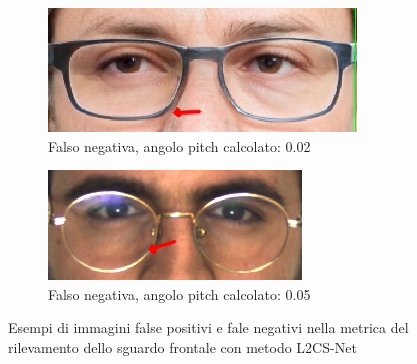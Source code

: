 \documentclass[12pt,a4paper,openright,twoside]{book}
\begin{document}
\begin{figure}[htbp]
    \begin{subfigure}{0.49\textwidth}
        \centering
        \includegraphics[width=.7\linewidth]{figures/frontal-gaze-l2cs-false-positive-97-1.png}
        \caption{Falso negativa, angolo pitch calcolato: 0.02}
        \label{fig:frontal_gaze_l2cs_false_positive}
    \end{subfigure}
    \hfill
    \centering
    \begin{subfigure}{0.49\textwidth}
        \centering
        \includegraphics[width=.7\linewidth]{figures/frontal-gaze-l2cs-false-negative-65-1.png}
        \caption{Falso negativa, angolo pitch calcolato: 0.05}
        \label{fig:frontal_gaze_l2cs_false_negative}
    \end{subfigure}
    \label{fig:frontal_gaze_l2cs_weakness}
    \caption{Esempi di immagini false positivi e fale negativi nella metrica del rilevamento dello sguardo frontale con metodo L2CS-Net}
\end{figure}
\end{document}
